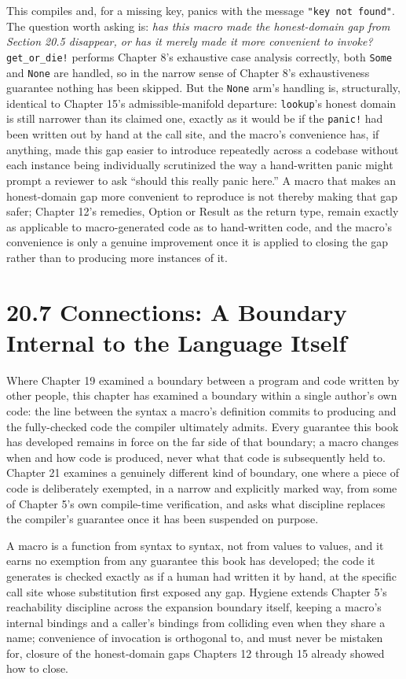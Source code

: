 \documentclass[11pt]{book}
\begin{document}
This compiles and, for a missing key, panics with the message \texttt{"key not found"}. The question worth asking is: \emph{has this macro made the honest-domain gap from Section 20.5 disappear, or has it merely made it more convenient to invoke?} \texttt{get\_or\_die!} performs Chapter 8's exhaustive case analysis correctly, both \texttt{Some} and \texttt{None} are handled, so in the narrow sense of Chapter 8's exhaustiveness guarantee nothing has been skipped. But the \texttt{None} arm's handling is, structurally, identical to Chapter 15's admissible-manifold departure: \texttt{lookup}'s honest domain is still narrower than its claimed one, exactly as it would be if the \texttt{panic!} had been written out by hand at the call site, and the macro's convenience has, if anything, made this gap easier to introduce repeatedly across a codebase without each instance being individually scrutinized the way a hand-written panic might prompt a reviewer to ask ``should this really panic here.'' A macro that makes an honest-domain gap more convenient to reproduce is not thereby making that gap safer; Chapter 12's remedies, Option or Result as the return type, remain exactly as applicable to macro-generated code as to hand-written code, and the macro's convenience is only a genuine improvement once it is applied to closing the gap rather than to producing more instances of it.

\section*{20.7 Connections: A Boundary Internal to the Language Itself}

Where Chapter 19 examined a boundary between a program and code written by other people, this chapter has examined a boundary within a single author's own code: the line between the syntax a macro's definition commits to producing and the fully-checked code the compiler ultimately admits. Every guarantee this book has developed remains in force on the far side of that boundary; a macro changes when and how code is produced, never what that code is subsequently held to. Chapter 21 examines a genuinely different kind of boundary, one where a piece of code is deliberately exempted, in a narrow and explicitly marked way, from some of Chapter 5's own compile-time verification, and asks what discipline replaces the compiler's guarantee once it has been suspended on purpose.

\begin{invariantbox}
A macro is a function from syntax to syntax, not from values to values, and it earns no exemption from any guarantee this book has developed; the code it generates is checked exactly as if a human had written it by hand, at the specific call site whose substitution first exposed any gap. Hygiene extends Chapter 5's reachability discipline across the expansion boundary itself, keeping a macro's internal bindings and a caller's bindings from colliding even when they share a name; convenience of invocation is orthogonal to, and must never be mistaken for, closure of the honest-domain gaps Chapters 12 through 15 already showed how to close.
\end{invariantbox}
\end{document}
